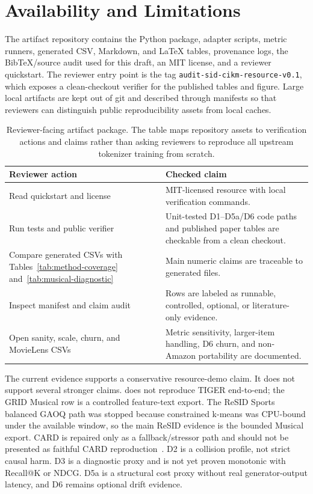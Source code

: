 \section{Availability and Limitations}

The artifact repository contains the \tool Python package, adapter scripts,
metric runners, generated CSV, Markdown, and \LaTeX{} tables, provenance logs,
the BibTeX/source audit used for this draft, an MIT license, and a reviewer
quickstart. The reviewer entry point is the tag
\texttt{audit-sid-cikm-resource-v0.1}, which exposes a clean-checkout verifier
for the published tables and figure. Large local artifacts are kept out of git
and described through manifests so that reviewers can distinguish public
reproducibility assets from local caches.

\begin{table}[t]
\caption{Reviewer-facing artifact package. The table maps repository assets to
verification actions and claims rather than asking reviewers to reproduce all
upstream tokenizer training from scratch.}
\label{tab:artifact-package}
\small
\setlength{\tabcolsep}{3pt}
\begin{tabularx}{\columnwidth}{@{}p{}Y@{}}
\toprule
Reviewer action & Checked claim \\
\midrule
Read quickstart and license & MIT-licensed resource with local verification
commands. \\
Run tests and public verifier & Unit-tested D1--D5a/D6 code paths and published
paper tables are checkable from a clean checkout. \\
Compare generated CSVs with Tables~\ref{tab:method-coverage}
and~\ref{tab:musical-diagnostic} & Main numeric claims are traceable to
generated files. \\
Inspect manifest and claim audit & Rows are labeled as runnable, controlled,
optional, or literature-only evidence. \\
Open sanity, scale, churn, and MovieLens CSVs & Metric sensitivity, larger-item
handling, D6 churn, and non-Amazon portability are documented. \\
\bottomrule
\end{tabularx}
\end{table}

The current evidence supports a conservative resource-demo claim. It does not
support several stronger claims. \tool does not reproduce TIGER end-to-end; the
GRID Musical row is a controlled feature-text export. The ReSID Sports balanced
GAOQ path was stopped because constrained k-means was CPU-bound under the
available window, so the main ReSID evidence is the bounded Musical export.
CARD is repaired only as a fallback/stressor path and should not be presented
as faithful CARD reproduction~\cite{wei2026card}. D2 is a collision profile,
not strict causal harm. D3 is a diagnostic proxy and is not yet proven
monotonic with Recall@K or NDCG. D5a is a structural cost proxy without real
generator-output latency, and D6 remains optional drift evidence.


